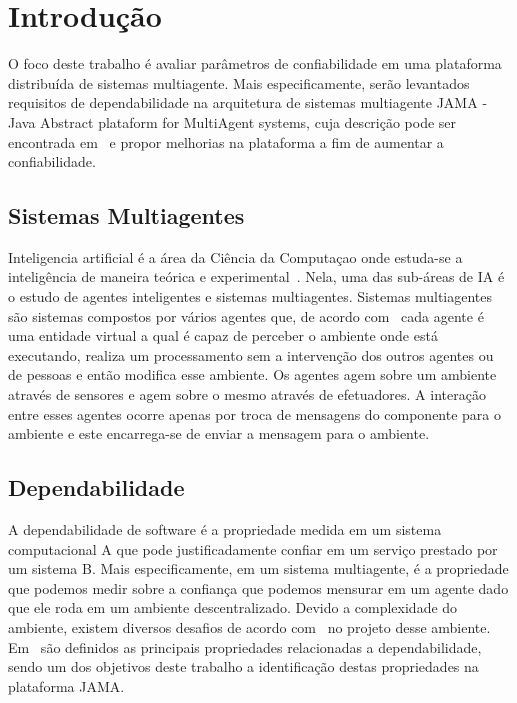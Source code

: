\chapter{Introdução}

O foco deste trabalho é avaliar parâmetros de confiabilidade em uma plataforma distribuída de sistemas multiagente. Mais especificamente, serão levantados requisitos de dependabilidade na
arquitetura de sistemas multiagente JAMA {-} Java Abstract plataform for MultiAgent systems, cuja descrição pode ser encontrada em~\cite{parise11} e propor melhorias
na plataforma a fim de aumentar a confiabilidade.

\section{Sistemas Multiagentes}

Inteligencia artificial é a área da Ciência da Computaçao onde estuda-se a inteligência de maneira teórica e experimental~\cite{novig95}. Nela, uma das sub-áreas
de IA é o estudo de agentes inteligentes e sistemas multiagentes. Sistemas multiagentes são sistemas compostos por vários agentes que, de acordo com~\cite{wooldridge95}
cada agente é uma entidade virtual a qual é capaz de perceber o ambiente onde está executando, realiza um processamento
sem a intervenção dos outros agentes ou de pessoas e então modifica esse ambiente. Os agentes agem sobre um ambiente através de sensores e agem sobre o mesmo através
de efetuadores. A interação entre esses agentes ocorre apenas por troca de mensagens do componente para o ambiente e este encarrega-se de enviar a mensagem para o ambiente.


\section{Dependabilidade}

A dependabilidade de software é a propriedade medida em um sistema computacional A que pode justificadamente confiar em um serviço prestado por um sistema B. Mais especificamente,
em um sistema multiagente, é a propriedade que podemos medir sobre a confiança que podemos mensurar em um agente dado que ele roda em um ambiente descentralizado. Devido a complexidade
do ambiente, existem diversos desafios de acordo com~\cite{hoffman08} no projeto desse ambiente. Em~\cite{algirdas04} são definidos as principais propriedades relacionadas
a dependabilidade, sendo um dos objetivos deste trabalho a identificação destas propriedades na plataforma JAMA.

